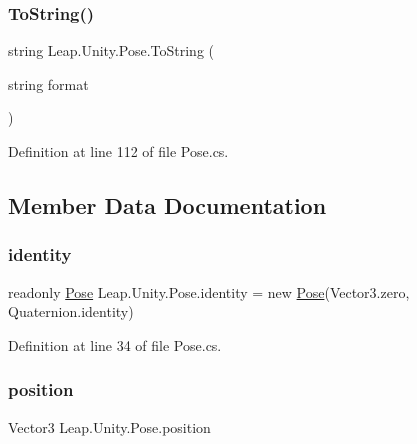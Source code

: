 \mbox{\label{struct_leap_1_1_unity_1_1_pose_a806409523b1d9b8325e0c58d660304a7}} 
\subsubsection{\texorpdfstring{ToString()}{ToString()}\hspace{0.1cm}{\footnotesize\ttfamily [2/2]}}
{\footnotesize\ttfamily string Leap.\+Unity.\+Pose.\+To\+String (\begin{DoxyParamCaption}\item[{string}]{format }\end{DoxyParamCaption})}



Definition at line 112 of file Pose.\+cs.



\subsection{Member Data Documentation}
\mbox{\label{struct_leap_1_1_unity_1_1_pose_ac98b12ebae014198abed5894475be71b}} 
\subsubsection{\texorpdfstring{identity}{identity}}
{\footnotesize\ttfamily readonly \mbox{\hyperlink{struct_leap_1_1_unity_1_1_pose}{Pose}} Leap.\+Unity.\+Pose.\+identity = new \mbox{\hyperlink{struct_leap_1_1_unity_1_1_pose}{Pose}}(Vector3.\+zero, Quaternion.\+identity)\hspace{0.3cm}{\ttfamily [static]}}



Definition at line 34 of file Pose.\+cs.

\mbox{\label{struct_leap_1_1_unity_1_1_pose_ad90ba514c97484e10d747d9bdf9b81a9}} 
\subsubsection{\texorpdfstring{position}{position}}
{\footnotesize\ttfamily Vector3 Leap.\+Unity.\+Pose.\+position}



